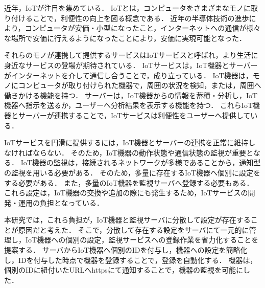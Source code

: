 近年，IoTが注目を集めている．
IoTとは，コンピュータをさまざまなモノに取り付けることで，利便性の向上を図る概念である．
近年の半導体技術の進歩により，コンピュータが安価・小型になったこと，インターネットへの通信が様々な場所で安価に行えるようになったことにより，安価に実現可能となった．
\medskip

それらのモノが連携して提供するサービスはIoTサービスと呼ばれ，より生活に身近なサービスの登場が期待されている．
IoTサービスは，IoT機器とサーバーがインターネットを介して通信し合うことで，成り立っている．
IoT機器は，モノにコンピュータが取り付けられた機器で，周囲の状況を検知，または，周囲へ働きかける機能を持つ．
サーバーは，IoT機器からの情報を蓄積・分析し，IoT機器へ指示を送るか，ユーザーへ分析結果を表示する機能を持つ．
これらIoT機器とサーバーが連携することで，IoTサービスは利便性をユーザーへ提供している．
\medskip

IoTサービスを円滑に提供するには，IoT機器とサーバーの連携を正常に維持しなければならない．
そのため，IoT機器の動作状態や通信状態の監視が重要となる．
IoT機器の監視は，接続されるネットワークが多様であることから，通知型の監視を用いる必要がある．
そのため，多量に存在するIoT機器へ個別に設定をする必要がある．
また，多量のIoT機器を監視サーバへ登録する必要もある．
これら設定は，IoT機器の交換や追加の際にも発生するため，IoTサービスの開発・運用の負担となっている．
\medskip

本研究では，これら負担が，IoT機器と監視サーバに分散して設定が存在することが原因だと考えた．
そこで，分散して存在する設定をサーバにて一元的に管理し，IoT機器への個別の設定，監視サービスへの登録作業を省力化することを提案する．
サーバからIoT機器へ個別のIDを付与し，機器への設定を簡略化し，IDを付与した時点で機器を登録することで，登録を自動化する．
機器は，個別のIDに紐付いたURLへhttpsにて通知することで，機器の監視を可能にした．

